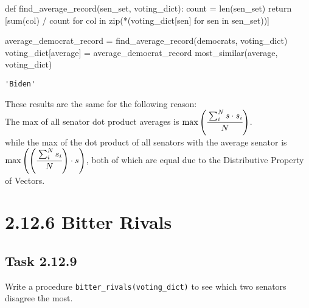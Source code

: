 \documentclass[
  letterpaper,
  DIV=11,
  numbers=noendperiod]{scrartcl}
\newenvironment{Shaded}{\begin{snugshade}}{\end{snugshade}}
\newcommand{\BuiltInTok}[1]{\textcolor[rgb]{0.00,0.23,0.31}{#1}}
\newcommand{\ControlFlowTok}[1]{\textcolor[rgb]{0.00,0.23,0.31}{#1}}
\newcommand{\KeywordTok}[1]{\textcolor[rgb]{0.00,0.23,0.31}{#1}}
\newcommand{\NormalTok}[1]{\textcolor[rgb]{0.00,0.23,0.31}{#1}}
\newcommand{\OperatorTok}[1]{\textcolor[rgb]{0.37,0.37,0.37}{#1}}
\newcommand{\StringTok}[1]{\textcolor[rgb]{0.13,0.47,0.30}{#1}}
\begin{document}
\begin{Shaded}
\begin{Highlighting}[numbers=left,,]
\KeywordTok{def}\NormalTok{ find\_average\_record(sen\_set, voting\_dict):}
\NormalTok{    count }\OperatorTok{=} \BuiltInTok{len}\NormalTok{(sen\_set)}
    \ControlFlowTok{return}\NormalTok{ [}\BuiltInTok{sum}\NormalTok{(col) }\OperatorTok{/}\NormalTok{ count }\ControlFlowTok{for}\NormalTok{ col }\KeywordTok{in} \BuiltInTok{zip}\NormalTok{(}\OperatorTok{*}\NormalTok{(voting\_dict[sen] }\ControlFlowTok{for}\NormalTok{ sen }\KeywordTok{in}\NormalTok{ sen\_set))]}

\NormalTok{average\_democrat\_record }\OperatorTok{=}\NormalTok{ find\_average\_record(democrats, voting\_dict)}
\NormalTok{voting\_dict[}\StringTok{\textquotesingle{}average\textquotesingle{}}\NormalTok{] }\OperatorTok{=}\NormalTok{ average\_democrat\_record}
\NormalTok{most\_similar(}\StringTok{\textquotesingle{}average\textquotesingle{}}\NormalTok{, voting\_dict)}
\end{Highlighting}
\end{Shaded}

\begin{verbatim}
'Biden'
\end{verbatim}

These results are the same for the following reason:\\
The max of all senator dot product averages is
\(\text{max}\left(\cfrac{\Large \sum_{i}^{N} s \cdot s_i}{N} \right)\).\\
while the max of the dot product of all senators with the average
senator is
\(\text{max}\left(\left(\cfrac{\Large \sum_{i}^{N} s_i}{N}\right) \cdot s \right)\),
both of which are equal due to the Distributive Property of Vectors.

\hypertarget{bitter-rivals}{%
\section{2.12.6 Bitter Rivals}\label{bitter-rivals}}

\hypertarget{task-2.12.9}{%
\subsection{Task 2.12.9}\label{task-2.12.9}}

Write a procedure \texttt{bitter\_rivals(voting\_dict)} to see which two
senators disagree the most.
\end{document}
